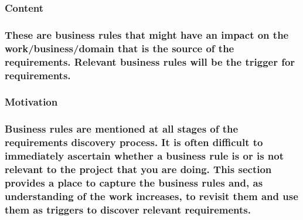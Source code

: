 \documentclass[
]{article}
\begin{document}
\hypertarget{content-20}{%
\subsubsection{Content}\label{content-20}}

\hypertarget{these-are-business-rules-that-might-have-an-impact-on-the-workbusinessdomain-that-is-the-source-of-the-requirements.-relevant-business-rules-will-be-the-trigger-for-requirements.}{%
\subsubsection{These are business rules that might have an impact on the
work/business/domain that is the source of the requirements. Relevant
business rules will be the trigger for
requirements.}\label{these-are-business-rules-that-might-have-an-impact-on-the-workbusinessdomain-that-is-the-source-of-the-requirements.-relevant-business-rules-will-be-the-trigger-for-requirements.}}

\hypertarget{motivation-20}{%
\subsubsection{Motivation}\label{motivation-20}}

\hypertarget{business-rules-are-mentioned-at-all-stages-of-the-requirements-discovery-process.-it-is-often-difficult-to-immediately-ascertain-whether-a-business-rule-is-or-is-not-relevant-to-the-project-that-you-are-doing.-this-section-provides-a-place-to-capture-the-business-rules-and-as-understanding-of-the-work-increases-to-revisit-them-and-use-them-as-triggers-to-discover-relevant-requirements.}{%
\subsubsection{\texorpdfstring{Business rules are mentioned at all
stages of the requirements discovery process. It is often difficult to
immediately ascertain whether a business rule is or is not relevant to
the project that you are doing. This section provides a place to capture
the business rules and, as understanding of the work increases, to
revisit them and use them as triggers to discover relevant requirements.
}{Business rules are mentioned at all stages of the requirements discovery process. It is often difficult to immediately ascertain whether a business rule is or is not relevant to the project that you are doing. This section provides a place to capture the business rules and, as understanding of the work increases, to revisit them and use them as triggers to discover relevant requirements. }}\label{business-rules-are-mentioned-at-all-stages-of-the-requirements-discovery-process.-it-is-often-difficult-to-immediately-ascertain-whether-a-business-rule-is-or-is-not-relevant-to-the-project-that-you-are-doing.-this-section-provides-a-place-to-capture-the-business-rules-and-as-understanding-of-the-work-increases-to-revisit-them-and-use-them-as-triggers-to-discover-relevant-requirements.}}
\end{document}
